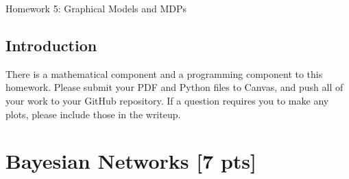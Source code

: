 \documentclass[submit]{harvardml}
\begin{document}
\begin{center}
{\Large Homework 5: Graphical Models and MDPs}\\
\end{center}

\subsection*{Introduction}

There is a mathematical component and a programming component to this
homework.  Please submit your PDF and Python files to Canvas, and push
all of your work to your GitHub repository. If a question requires you
to make any plots, please include those in the writeup.

\newpage
\section*{Bayesian Networks [7 pts]}
\end{document}
